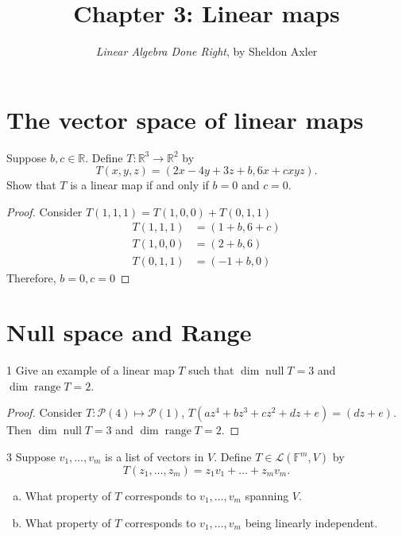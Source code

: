 \documentclass{extarticle}
\title{\vspace{-2em}Chapter 3: Linear maps}
\author{\emph{Linear Algebra Done Right}, by Sheldon Axler}
\date{}
\newenvironment{problem}[1]{\begin{prob*}{#1}{}}{\end{prob*}}
\newcommand{\R}{\mathbb{R}}
\newcommand{\F}{\mathbb{F}}
\newcommand{\poly}{\mathcal{P}}
\newcommand{\Hom}{\mathcal{L}}
\DeclareMathOperator{\Null}{null}
\DeclareMathOperator{\Range}{range}
\begin{document}
\maketitle

\newpage
\tableofcontents
\newpage

\section{The vector space of linear maps}

\begin{problem}
Suppose \(b,c \in \R\). Define \(T : \R^3 \to \R^2\) by \[
T(x,y,z) = ( 2x - 4y + 3z + b, 6x + cxyz).\]
Show that $T$ is a linear map if and only if \(b = 0\) and \(c = 0\).
\end{problem}


\begin{proof}
Consider \(T(1,1,1) = T(1,0,0) + T(0,1,1)\)
\begin{align}
  T(1,1,1) &= (1 + b, 6 + c) \\
  T(1,0,0) &= (2 + b, 6) \\
  T(0,1,1) &= (-1 + b, 0)
\end{align}
Therefore, \(b=0, c=0\)
\end{proof}

\section{Null space and Range}

\begin{problem}{1}
Give an example of a linear map $T$ such that \(\dim \Null T = 3\) and \(\dim \Range T = 2\).
\end{problem}

\begin{proof}
Consider \(T : \poly (4) \mapsto \poly (1)\), \(T(a z^4 +b z^3 + c z^2 + d z + e) = (d z + e)\). Then \(\dim \Null T = 3\) and \(\dim \Range T = 2\).
\end{proof}

\begin{problem}{3}
Suppose \(v_1 , \dots, v_m\) is a list of vectors in $V$. Define \(T \in \Hom(\F^m, V)\) by \[
  T(z_1, \dots, z_m) = z_1v_1 + \dots + z_mv_m.\]
\begin{enumerate}[(a)]
  \item What property of $T$ corresponds to \(v_1, \dots, v_m\) spanning $V$.
  \item What property of $T$ corresponds to \(v_1, \dots, v_m\) being linearly independent.
\end{enumerate}
\end{problem}
\end{document}
